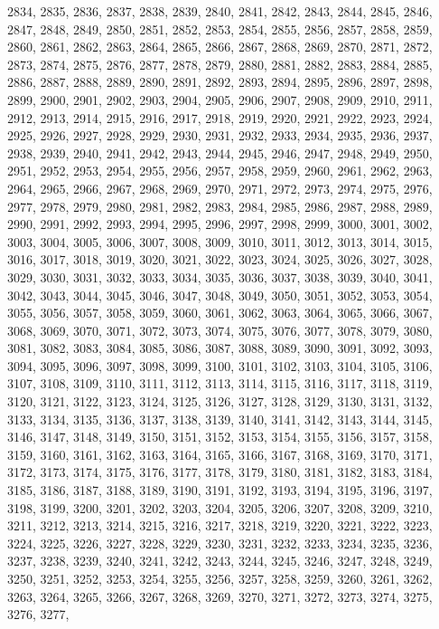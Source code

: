 \documentclass[a4paper,11pt]{article}
\numberwithin{equation}{section}
\begin{document}
2834, 2835, 2836, 2837, 2838, 2839, 2840, 2841, 2842, 2843, 2844, 2845,
2846, 2847, 2848, 2849, 2850, 2851, 2852, 2853, 2854, 2855, 2856, 2857,
2858, 2859, 2860, 2861, 2862, 2863, 2864, 2865, 2866, 2867, 2868, 2869,
2870, 2871, 2872, 2873, 2874, 2875, 2876, 2877, 2878, 2879, 2880, 2881,
2882, 2883, 2884, 2885, 2886, 2887, 2888, 2889, 2890, 2891, 2892, 2893,
2894, 2895, 2896, 2897, 2898, 2899, 2900, 2901, 2902, 2903, 2904, 2905,
2906, 2907, 2908, 2909, 2910, 2911, 2912, 2913, 2914, 2915, 2916, 2917,
2918, 2919, 2920, 2921, 2922, 2923, 2924, 2925, 2926, 2927, 2928, 2929,
2930, 2931, 2932, 2933, 2934, 2935, 2936, 2937, 2938, 2939, 2940, 2941,
2942, 2943, 2944, 2945, 2946, 2947, 2948, 2949, 2950, 2951, 2952, 2953,
2954, 2955, 2956, 2957, 2958, 2959, 2960, 2961, 2962, 2963, 2964, 2965,
2966, 2967, 2968, 2969, 2970, 2971, 2972, 2973, 2974, 2975, 2976, 2977,
2978, 2979, 2980, 2981, 2982, 2983, 2984, 2985, 2986, 2987, 2988, 2989,
2990, 2991, 2992, 2993, 2994, 2995, 2996, 2997, 2998, 2999, 3000, 3001,
3002, 3003, 3004, 3005, 3006, 3007, 3008, 3009, 3010, 3011, 3012, 3013,
3014, 3015, 3016, 3017, 3018, 3019, 3020, 3021, 3022, 3023, 3024, 3025,
3026, 3027, 3028, 3029, 3030, 3031, 3032, 3033, 3034, 3035, 3036, 3037,
3038, 3039, 3040, 3041, 3042, 3043, 3044, 3045, 3046, 3047, 3048, 3049,
3050, 3051, 3052, 3053, 3054, 3055, 3056, 3057, 3058, 3059, 3060, 3061,
3062, 3063, 3064, 3065, 3066, 3067, 3068, 3069, 3070, 3071, 3072, 3073,
3074, 3075, 3076, 3077, 3078, 3079, 3080, 3081, 3082, 3083, 3084, 3085,
3086, 3087, 3088, 3089, 3090, 3091, 3092, 3093, 3094, 3095, 3096, 3097,
3098, 3099, 3100, 3101, 3102, 3103, 3104, 3105, 3106, 3107, 3108, 3109,
3110, 3111, 3112, 3113, 3114, 3115, 3116, 3117, 3118, 3119, 3120, 3121,
3122, 3123, 3124, 3125, 3126, 3127, 3128, 3129, 3130, 3131, 3132, 3133,
3134, 3135, 3136, 3137, 3138, 3139, 3140, 3141, 3142, 3143, 3144, 3145,
3146, 3147, 3148, 3149, 3150, 3151, 3152, 3153, 3154, 3155, 3156, 3157,
3158, 3159, 3160, 3161, 3162, 3163, 3164, 3165, 3166, 3167, 3168, 3169,
3170, 3171, 3172, 3173, 3174, 3175, 3176, 3177, 3178, 3179, 3180, 3181,
3182, 3183, 3184, 3185, 3186, 3187, 3188, 3189, 3190, 3191, 3192, 3193,
3194, 3195, 3196, 3197, 3198, 3199, 3200, 3201, 3202, 3203, 3204, 3205,
3206, 3207, 3208, 3209, 3210, 3211, 3212, 3213, 3214, 3215, 3216, 3217,
3218, 3219, 3220, 3221, 3222, 3223, 3224, 3225, 3226, 3227, 3228, 3229,
3230, 3231, 3232, 3233, 3234, 3235, 3236, 3237, 3238, 3239, 3240, 3241,
3242, 3243, 3244, 3245, 3246, 3247, 3248, 3249, 3250, 3251, 3252, 3253,
3254, 3255, 3256, 3257, 3258, 3259, 3260, 3261, 3262, 3263, 3264, 3265,
3266, 3267, 3268, 3269, 3270, 3271, 3272, 3273, 3274, 3275, 3276, 3277,
\end{document}
